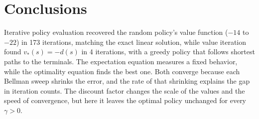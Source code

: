 \documentclass[11pt]{article}
\begin{document}
\section{Conclusions}
Iterative policy evaluation recovered the random policy's value function ($-14$ to $-22$) in
173 iterations, matching the exact linear solution, while value iteration found
$v_*(s) = -d(s)$ in 4 iterations, with a greedy policy that follows shortest paths to the
terminals. The expectation equation measures a fixed behavior, while the optimality equation
finds the best one. Both converge because each Bellman sweep shrinks the error, and the rate of
that shrinking explains the gap in iteration counts. The discount factor changes the scale of
the values and the speed of convergence, but here it leaves the optimal policy unchanged for
every $\gamma > 0$.
\end{document}

